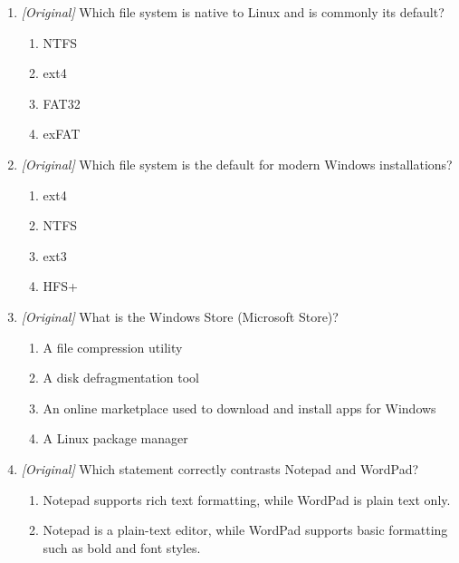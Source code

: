 \documentclass[11pt]{article}
\begin{document}
\begin{enumerate}[label=\textbf{Q\arabic*.}, leftmargin=*]
  purpose is correct?
  \begin{enumerate}[label=\Alph*.]
    \item \texttt{/root} --- the home directory of the superuser (root user)
    \item \texttt{/home} --- the home directory of the superuser
    \item \texttt{/root} --- the home directories of ordinary users
    \item \texttt{/home} --- the root of the whole file system
  \end{enumerate}
\item \textit{[Original]} Which file system is native to Linux and is commonly
  its default?
  \begin{enumerate}[label=\Alph*.]
    \item NTFS
    \item ext4
    \item FAT32
    \item exFAT
  \end{enumerate}
\item \textit{[Original]} Which file system is the default for modern Windows
  installations?
  \begin{enumerate}[label=\Alph*.]
    \item ext4
    \item NTFS
    \item ext3
    \item HFS+
  \end{enumerate}
\item \textit{[Original]} What is the Windows Store (Microsoft Store)?
  \begin{enumerate}[label=\Alph*.]
    \item A file compression utility
    \item A disk defragmentation tool
    \item An online marketplace used to download and install apps for Windows
    \item A Linux package manager
  \end{enumerate}
\item \textit{[Original]} Which statement correctly contrasts Notepad and
  WordPad?
  \begin{enumerate}[label=\Alph*.]
    \item Notepad supports rich text formatting, while WordPad is plain text
      only.
    \item Notepad is a plain-text editor, while WordPad supports basic
      formatting such as bold and font styles.

\end{enumerate}
\end{enumerate}
\end{document}
